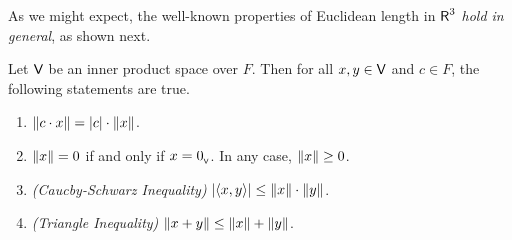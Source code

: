 As we might expect, the well-known properties of Euclidean length in \(\textsf{R}^3\) \emph{hold in general}, as shown next.

\begin{theorem} \label{thm 6.2}
Let \(\textsf{V}\) be an inner product space over \(F\).
Then for all \(x, y \in \textsf{V}\) and \(c \in F\), the following statements are true.
\begin{enumerate}
\item \(\left\lVert c \cdot x\right\rVert = \lvert c\rvert \cdot \left\lVert x\right\rVert\).
\item \(\left\lVert x\right\rVert = 0\) if and only if \(x = 0_{_{\textsf{V}}}\).
In any case, \(\left\lVert x\right\rVert \ge 0\).
\item \emph{(Caucby-Schwarz Inequality)} \(\lvert\left< x, y \right>\rvert \le \left\lVert x\right\rVert \cdot \left\lVert y\right\rVert\).
\item \emph{(Triangle Inequality)} \(\left\lVert x + y\right\rVert \le \left\lVert x\right\rVert + \left\lVert y\right\rVert\).
\end{enumerate}
\end{theorem}

